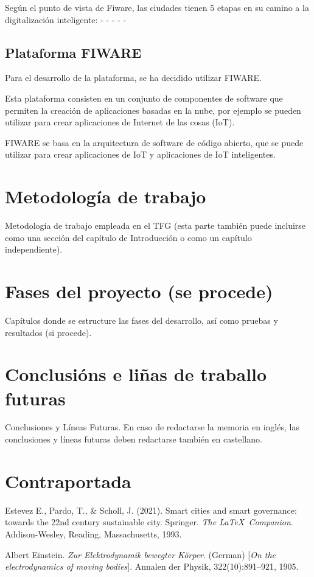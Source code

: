 \documentclass[12pt, a4paper, twoside]{article}
\begin{document}
 Según el punto de vista de Fiware, las ciudades tienen 5 etapas en su camino a la digitalización inteligente:
 - 
 -
 -
 -
 -



  \subsection{Plataforma FIWARE} 
 Para el desarrollo de la plataforma, se ha decidido utilizar FIWARE.
 
Esta plataforma consisten en un conjunto de componentes de software que permiten la creación 
de aplicaciones basadas en la nube, por ejemplo se pueden utilizar para crear aplicaciones de 
Internet de las cosas (IoT). 

FIWARE se basa en la arquitectura de software de código abierto, que se puede utilizar para crear 
aplicaciones de IoT y aplicaciones de IoT inteligentes.

 \section{Metodología de trabajo}
 Metodología de trabajo empleada en el TFG (esta parte también puede incluirse como una sección del capítulo de Introducción o como un capítulo independiente).

 \section{Fases del proyecto (se procede)}
 Capítulos donde se estructure las fases del desarrollo, así como pruebas y resultados (si procede). 

\section{Conclusións e liñas de traballo futuras}
Conclusiones y Líneas Futuras. En caso de redactarse la memoria en inglés, las conclusiones y líneas futuras deben redactarse también en castellano.

\section{Contraportada}
\begin{thebibliography}{9}
  Estevez E., Pardo, T., \& Scholl, J. (2021).
Smart cities and smart governance: towards the 22nd century sustainable city. Springer.
    \textit{The \LaTeX\ Companion}. 
    Addison-Wesley, Reading, Massachusetts, 1993.
    
    Albert Einstein. 
    \textit{Zur Elektrodynamik bewegter K{\"o}rper}. (German) 
    [\textit{On the electrodynamics of moving bodies}]. 
    Annalen der Physik, 322(10):891–921, 1905.

\end{thebibliography}
\end{document}
